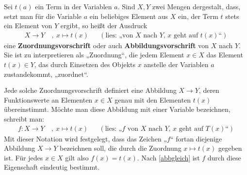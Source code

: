 \begin{nota} \label{def:zuordnung}  
    Sei $t(a)$ ein Term in der Variablen $a$. Sind $X,Y$ zwei Mengen dergestalt, dass, setzt man für die Variable $a$ ein beliebiges Element aus $X$ ein, der Term $t$ stets ein Element von $Y$ ergibt, so heißt der Ausdruck
    \begin{align*}
        X \to Y \ &,\ x\mapsto t(x) && (\text{lies: „von $X$ nach $Y$, $x$ geht auf $t(x)$“})
    \end{align*}
    eine \textbf{Zuordnungsvorschrift} oder auch \textbf{Abbildungsvorschrift} von $X$ nach $Y$. Sie ist zu interpretieren als „Zuordnung“, die jedem Element $x\in X$ das Element $t(x)\in Y$, das durch Einsetzen des Objekts $x$ anstelle der Variablen $a$ zustandekommt, „zuordnet“.
    
    Jede solche Zuordnungsvorschrift definiert eine Abbildung $X\to Y$, deren Funktionswerte an Elementen $x\in X$ genau mit den Elementen $t(x)$ übereinstimmt. Möchte man diese Abbildung mit einer Variable bezeichnen, schreibt man:
    \begin{align*}
        f : X\to Y \ & ,\ x\mapsto t(x) && (\text{lies: „$f$ von $X$ nach $Y$, $x$ geht auf $T(x)$“})
    \end{align*}
    Mit dieser Notation wird festgelegt, dass das Zeichen „$f$“ fortan diejenige Abbildung $X\to Y$ bezeichnen soll, die durch die Zuordnung $x\mapsto t(x)$ gegeben ist. Für jedes $x\in X$ gilt also $f(x)=t(x)$. Nach \cref{abbgleich} ist $f$ durch diese Eigenschaft eindeutig bestimmt.
\end{nota}


